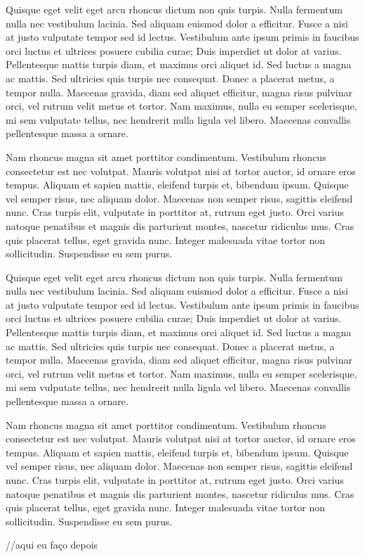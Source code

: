 \documentclass[a4paper]{article}
\begin{document}
    \begin{answer}
        Quisque eget velit eget arcu rhoncus dictum non quis turpis. Nulla fermentum nulla nec vestibulum lacinia. Sed aliquam euismod dolor a efficitur. Fusce a nisi at justo vulputate tempor sed id lectus. Vestibulum ante ipsum primis in faucibus orci luctus et ultrices posuere cubilia curae; Duis imperdiet ut dolor at varius. Pellentesque mattis turpis diam, et maximus orci aliquet id. Sed luctus a magna ac mattis. Sed ultricies quis turpis nec consequat. Donec a placerat metus, a tempor nulla. Maecenas gravida, diam sed aliquet efficitur, magna risus pulvinar orci, vel rutrum velit metus et tortor. Nam maximus, nulla eu semper scelerisque, mi sem vulputate tellus, nec hendrerit nulla ligula vel libero. Maecenas convallis pellentesque massa a ornare.

        Nam rhoncus magna sit amet porttitor condimentum. Vestibulum rhoncus consectetur est nec volutpat. Mauris volutpat nisi at tortor auctor, id ornare eros tempus. Aliquam et sapien mattis, eleifend turpis et, bibendum ipsum. Quisque vel semper risus, nec aliquam dolor. Maecenas non semper risus, sagittis eleifend nunc. Cras turpis elit, vulputate in porttitor at, rutrum eget justo. Orci varius natoque penatibus et magnis dis parturient montes, nascetur ridiculus mus. Cras quis placerat tellus, eget gravida nunc. Integer malesuada vitae tortor non sollicitudin. Suspendisse eu sem purus.
    \end{answer}

    \begin{answer}
        Quisque eget velit eget arcu rhoncus dictum non quis turpis. Nulla fermentum nulla nec vestibulum lacinia. Sed aliquam euismod dolor a efficitur. Fusce a nisi at justo vulputate tempor sed id lectus. Vestibulum ante ipsum primis in faucibus orci luctus et ultrices posuere cubilia curae; Duis imperdiet ut dolor at varius. Pellentesque mattis turpis diam, et maximus orci aliquet id. Sed luctus a magna ac mattis. Sed ultricies quis turpis nec consequat. Donec a placerat metus, a tempor nulla. Maecenas gravida, diam sed aliquet efficitur, magna risus pulvinar orci, vel rutrum velit metus et tortor. Nam maximus, nulla eu semper scelerisque, mi sem vulputate tellus, nec hendrerit nulla ligula vel libero. Maecenas convallis pellentesque massa a ornare.

        Nam rhoncus magna sit amet porttitor condimentum. Vestibulum rhoncus consectetur est nec volutpat. Mauris volutpat nisi at tortor auctor, id ornare eros tempus. Aliquam et sapien mattis, eleifend turpis et, bibendum ipsum. Quisque vel semper risus, nec aliquam dolor. Maecenas non semper risus, sagittis eleifend nunc. Cras turpis elit, vulputate in porttitor at, rutrum eget justo. Orci varius natoque penatibus et magnis dis parturient montes, nascetur ridiculus mus. Cras quis placerat tellus, eget gravida nunc. Integer malesuada vitae tortor non sollicitudin. Suspendisse eu sem purus.
    \end{answer}

    \begin{answer}
        //aqui eu faço depois
    \end{answer}
\end{document}
